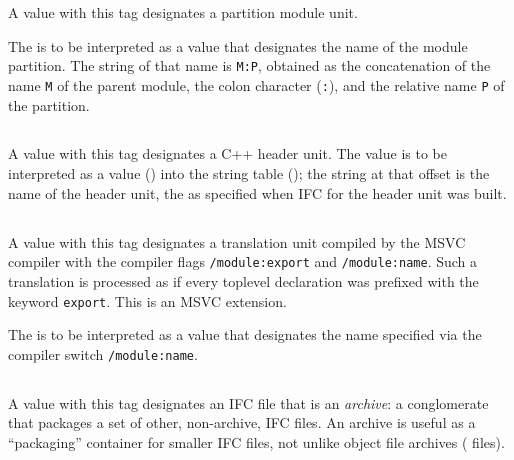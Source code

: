 A  value with this tag designates a partition module unit.

The  is to be interpreted as a  value that designates the name of the module partition.  
The string of that name is \texttt{M:P}, obtained as the concatenation of the name \texttt{M} of the parent module, 
the colon character (\texttt{:}), and the relative name \texttt{P} of the partition.

\subsection{}
\label{sec:ifc:UnitSort:Header}

A  value with this tag designates a C++ header unit.  
The  value is to be interpreted as a  value ()
into the string table (); the string at that offset is the name of the
header unit, \ie{} the  as specified when IFC for the header unit was built.


\subsection{}
\label{sec:ifc:UnitSort:ExportedTU}

A  value with this tag designates a translation unit compiled by the MSVC compiler with the compiler flags
\texttt{/module:export} and \texttt{/module:name}.  Such a translation is processed as if every toplevel declaration was
prefixed with the keyword \texttt{export}.  This is an MSVC extension.

The  is to be interpreted as a  value that designates the name specified via the compiler
switch \texttt{/module:name}.


\subsection{}
\label{sec:ifc:UnitSort:Archive}

A  value with this tag designates an IFC file that is an \emph{archive}: a conglomerate that packages
a set of other, non-archive, IFC files.  An archive is useful as a ``packaging'' container for smaller IFC files, not unlike
object file archives (\eg{}  files).

